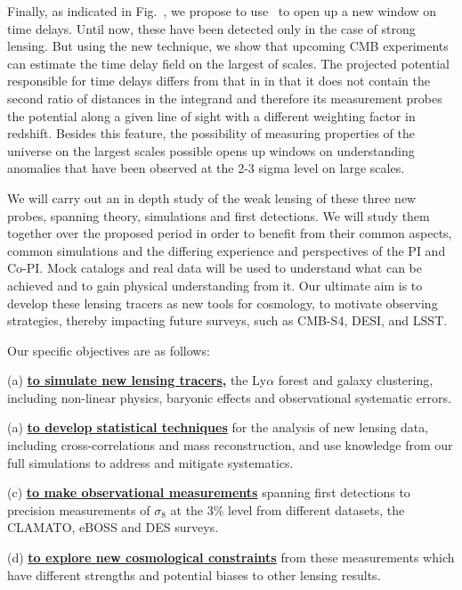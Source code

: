 Finally, as indicated in Fig.~, we propose to use \atf\ to
open up a new window on time delays. Until now, these have been
detected only in the case of strong lensing. But using the new
technique, we show that upcoming CMB experiments can estimate the time
delay field on the largest of scales. The projected potential
responsible for time delays differs from that in  in that it
does not contain the second ratio of distances in the integrand and
therefore its measurement probes the potential along a given line of
sight with a different weighting factor in redshift. Besides this
feature, the possibility of measuring properties of the universe on
the largest scales possible opens up windows on understanding
anomalies that have been observed at the 2-3 sigma level on large
scales.

We will carry out an in depth study of 
the weak lensing of these three new probes, spanning theory, 
simulations and first detections. 
We will study them together over the proposed period in order to benefit from
their common aspects, common
simulations and
the differing experience and perspectives of the PI and Co-PI.
Mock catalogs and  real data will be used to understand what can be achieved and to gain physical understanding
from it. Our ultimate aim is to develop these lensing tracers as new tools
for cosmology, to motivate 
observing strategies, thereby impacting future surveys, such as CMB-S4, DESI, and LSST. 



Our specific objectives are as follows:

(a) {\bf \underline{to simulate new lensing tracers,}} the Ly$\alpha$ forest and galaxy clustering,
 including non-linear physics, baryonic effects and observational
systematic errors.

(a) {\bf \underline{to develop statistical techniques}} for the analysis of new lensing data, including 
cross-correlations and mass reconstruction, and use knowledge from our full simulations to address and mitigate systematics.


(c) {\bf \underline{to make observational measurements}} spanning first 
detections to precision measurements of $\sigma_{8}$ at the 3\% level 
from different datasets, the CLAMATO, eBOSS and DES surveys.

(d) {\bf \underline{to explore new cosmological constraints}} from these
measurements which have different strengths and potential biases  to other
lensing results.

